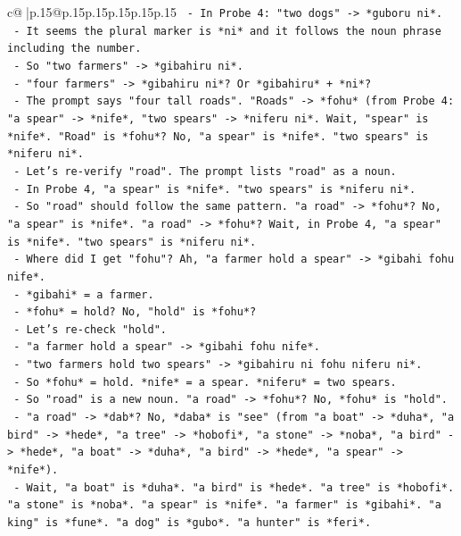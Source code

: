 \documentclass{article}
\begin{document}
{\begin{supertabular}{c@{$\;$}|p{.15\linewidth}@{}p{.15\linewidth}p{.15\linewidth}p{.15\linewidth}p{.15\linewidth}p{.15\linewidth}}
{{{\texttt{          {-} In Probe 4: "two dogs" {-}> *guboru ni*.} \\
\texttt{          {-} It seems the plural marker is *ni* and it follows the noun phrase including the number.} \\
\texttt{          {-} So "two farmers" {-}> *gibahiru ni*.} \\
\texttt{          {-} "four farmers" {-}> *gibahiru ni*? Or *gibahiru* + *ni*?} \\
\texttt{          {-} The prompt says "four tall roads". "Roads" {-}> *fohu* (from Probe 4: "a spear" {-}> *nife*, "two spears" {-}> *niferu ni*. Wait, "spear" is *nife*. "Road" is *fohu*? No, "a spear" is *nife*. "two spears" is *niferu ni*.} \\
\texttt{          {-} Let's re{-}verify "road". The prompt lists "road" as a noun.} \\
\texttt{          {-} In Probe 4, "a spear" is *nife*. "two spears" is *niferu ni*.} \\
\texttt{          {-} So "road" should follow the same pattern. "a road" {-}> *fohu*? No, "a spear" is *nife*. "a road" {-}> *fohu*? Wait, in Probe 4, "a spear" is *nife*. "two spears" is *niferu ni*.} \\
\texttt{          {-} Where did I get "fohu"? Ah, "a farmer hold a spear" {-}> *gibahi fohu nife*.} \\
\texttt{            {-} *gibahi* = a farmer.} \\
\texttt{            {-} *fohu* = hold? No, "hold" is *fohu*?} \\
\texttt{            {-} Let's re{-}check "hold".} \\
\texttt{            {-} "a farmer hold a spear" {-}> *gibahi fohu nife*.} \\
\texttt{            {-} "two farmers hold two spears" {-}> *gibahiru ni fohu niferu ni*.} \\
\texttt{            {-} So *fohu* = hold. *nife* = a spear. *niferu* = two spears.} \\
\texttt{            {-} So "road" is a new noun. "a road" {-}> *fohu*? No, *fohu* is "hold".} \\
\texttt{            {-} "a road" {-}> *dab*? No, *daba* is "see" (from "a boat" {-}> *duha*, "a bird" {-}> *hede*, "a tree" {-}> *hobofi*, "a stone" {-}> *noba*, "a bird" {-}> *hede*, "a boat" {-}> *duha*, "a bird" {-}> *hede*, "a spear" {-}> *nife*).} \\
\texttt{            {-} Wait, "a boat" is *duha*. "a bird" is *hede*. "a tree" is *hobofi*. "a stone" is *noba*. "a spear" is *nife*. "a farmer" is *gibahi*. "a king" is *fune*. "a dog" is *gubo*. "a hunter" is *feri*.} \\
}}}
\end{supertabular}}
\end{document}
